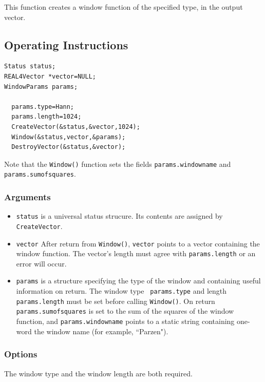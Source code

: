 \documentclass{article}
\begin{document}
This function creates a window function of the specified type, in the
output vector.

\subsection{Operating Instructions}


\begin{verbatim}
Status status; 
REAL4Vector *vector=NULL;
WindowParams params;

  params.type=Hann;
  params.length=1024;
  CreateVector(&status,&vector,1024);
  Window(&status,vector,&params);
  DestroyVector(&status,&vector);

\end{verbatim}

Note that the {\tt Window()} function sets the fields {\tt params.windowname} and
{\tt params.sumofsquares}.

\subsubsection{Arguments}


\begin{itemize}
\item {\tt status\/} is a universal status strucure. Its contents are 
assigned by {\tt CreateVector}.
\item {\tt vector\/} After
return from {\tt Window()}, {\tt vector} points to a vector containing the window function.
The vector's length must
agree with {\tt params.length} or an error will occur.
\item {\tt params\/} is a structure specifying the type of the window
and containing useful information on return.  The window type {\tt
params.type} and length {\tt params.length} must be set before calling
{\tt Window()}.  On return {\tt params.sumofsquares} is set to the sum of
the squares of the window function, and {\tt params.windowname} points
to a static string containing one-word the window name (for example,
``Parzen").
\end{itemize}

\subsubsection{Options}

The window type and the window length are both required.
\end{document}
